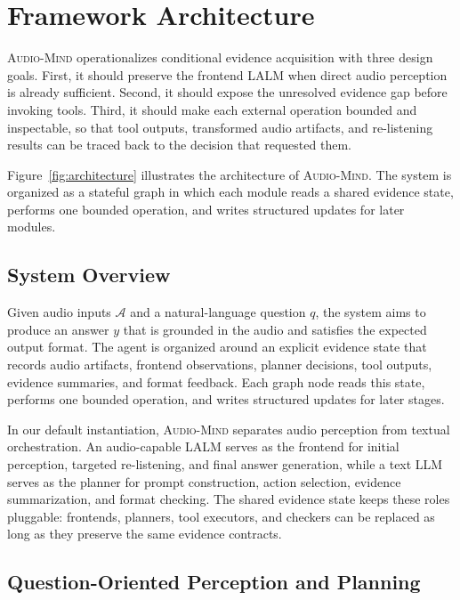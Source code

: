 \documentclass[11pt]{article}
\newcommand{\ours}{\textsc{Audio-Mind}}
\begin{document}
\section{Framework Architecture}
\label{sec:method}

\ours{} operationalizes conditional evidence acquisition with three design goals. First, it should preserve the frontend LALM when direct audio perception is already sufficient. Second, it should expose the unresolved evidence gap before invoking tools. Third, it should make each external operation bounded and inspectable, so that tool outputs, transformed audio artifacts, and re-listening results can be traced back to the decision that requested them.

Figure~\ref{fig:architecture} illustrates the architecture of \ours{}. The system is organized as a stateful graph in which each module reads a shared evidence state, performs one bounded operation, and writes structured updates for later modules.

\subsection{System Overview}
\label{sec:system_overview}

Given audio inputs $\mathcal{A}$ and a natural-language question $q$, the system aims to produce an answer $y$ that is grounded in the audio and satisfies the expected output format. The agent is organized around an explicit evidence state that records audio artifacts, frontend observations, planner decisions, tool outputs, evidence summaries, and format feedback. Each graph node reads this state, performs one bounded operation, and writes structured updates for later stages.

In our default instantiation, \ours{} separates audio perception from textual orchestration. An audio-capable LALM serves as the frontend for initial perception, targeted re-listening, and final answer generation, while a text LLM serves as the planner for prompt construction, action selection, evidence summarization, and format checking. The shared evidence state keeps these roles pluggable: frontends, planners, tool executors, and checkers can be replaced as long as they preserve the same evidence contracts.

\subsection{Question-Oriented Perception and Planning}
\label{sec:perception_and_planning}
\end{document}
